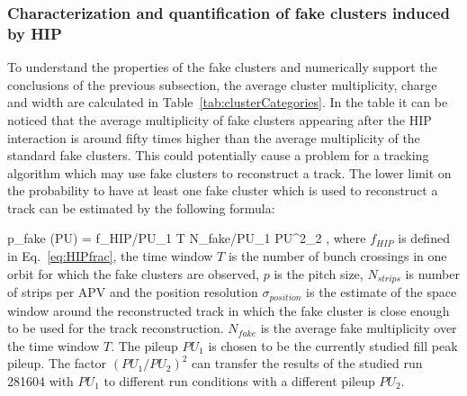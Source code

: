 
\subsubsection{Characterization and quantification of fake clusters induced by HIP~\label{sec:fakes}}

To understand the properties of the fake clusters and numerically support the conclusions of the previous subsection, the average cluster multiplicity, charge and width are calculated in Table~\ref{tab:clusterCategories}. In the table it can be noticed that the average multiplicity of fake clusters appearing after the HIP interaction is around fifty times higher than the average multiplicity of the standard fake clusters. This could potentially cause a problem for a tracking algorithm which may use fake clusters to reconstruct a track. The lower limit on the probability to have at least one fake cluster which is used to reconstruct a track can be estimated by the following formula:


{
   p_{fake} (PU) = f_{HIP}/PU_{1} \times T  \times N_{fake}/PU_{1} \times PU^2_{2} \times  {}  ,
}
where $f_{HIP}$ is defined in Eq.~\ref{eq:HIPfrac}, the time window $T$ is the number of bunch crossings in one orbit for which the fake clusters are observed, $p$ is the pitch size, $N_{strips}$ is number of strips per APV and the position resolution $\sigma_{position}$ is the estimate of the space window around the reconstructed track in which the fake cluster is close enough to be used for the track reconstruction. $N_{fake}$ is the average fake multiplicity over the time window $T$. The pileup $PU_{1}$ is chosen to be the currently studied fill peak pileup. The factor $(PU_{1}/PU_{2})^2$ can transfer the results of the studied run 281604 with $PU_{1}$ to different run conditions with a different pileup $PU_{2}$.  


\begin{table}
\begin{center}
\caption[Table caption text]{The average cluster charge, multiplicity and width for the four categories defined in Table~\ref{tab:eventCategories} for the run 281604. These quantities are computed from both on-track and off-track clusters.}
\label{tab:clusterCategories}
\end{center}
\end{table}

